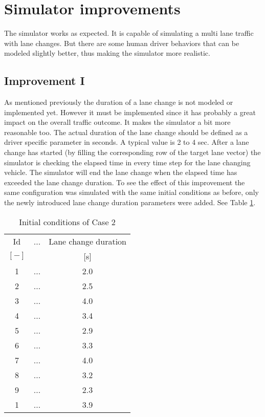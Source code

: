 		\section{Simulator improvements}
		The simulator works as expected. It is capable of simulating a multi lane traffic with lane changes. But there are some human driver behaviors that can be modeled slightly better, thus making the simulator  more realistic.
		\subsection{Improvement I}
		As mentioned previously the duration of a lane change is not modeled or implemented yet.  However it must be implemented since it has probably a great impact on the overall traffic outcome. It makes the simulator a bit more reasonable too. The actual duration of the lane change should be defined as a driver specific parameter in seconds. A typical value is 2 to 4 sec. After a lane change has started (by filling the corresponding row of the target lane vector) the simulator is checking the elapsed time in every time step for the lane changing vehicle. The simulator will end the lane change when the elapsed time has exceeded the lane change duration. To see the effect of this improvement the same configuration was simulated with the same initial conditions as before, only the newly introduced lane change duration parameters were added. See Table \ref{tab:lane_change_duration}.
		\begin{table}
			\begin{center}
				\begin{tabular}{ |c|c|c| }
					\hline
					Id & ... & Lane change duration\\
					$[-]$ & & [s]\\
					\hline
					1 & ... & 2.0\\
					2 & ... & 2.5\\
					3 & ... & 4.0\\
					4 & ... & 3.4\\
					5 & ... & 2.9\\
					6 & ... & 3.3\\
					7 & ... & 4.0\\
					8 & ... & 3.2\\
					9 & ... & 2.3\\
					1 & ... & 3.9\\
					\hline
				\end{tabular}
			\end{center}
			\caption{Initial conditions of Case 2}
			\label{tab:lane_change_duration}
		\end{table}
		
